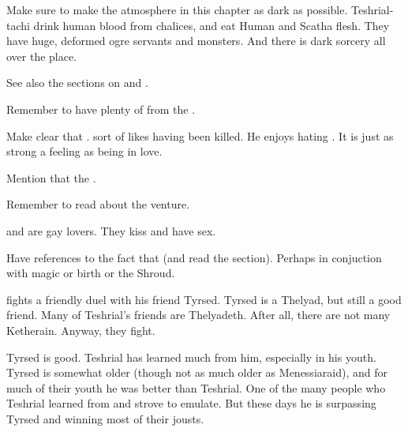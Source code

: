 





Make sure to make the atmosphere in this chapter as dark as possible. 
Teshrial-tachi drink human blood from chalices, and eat Human and Scatha flesh. 
They have huge, deformed ogre servants and monsters. 
And there is dark sorcery all over the place. 

See also the sections on  and . 

Remember to have plenty of  from the \resphain. 

Make clear that .
\Teshrial sort of likes having been killed. 
He enjoys hating \Ishnaruchaefir. 
It is just as strong a feeling as being in love.
    
Mention that the \resphain {}. 

Remember to read about the {\Malcur venture}. 

\Teshrial and \Menessiaraid are gay lovers. 
They kiss and have sex.
    
Have references to the fact that  (and read the section). 
Perhaps in conjuction with magic or birth or the Shroud.  









\begin{comment}
\subsection{Flying}
\end{comment}

\Teshrial{} fights a friendly duel with his friend Tyrsed.
Tyrsed is a Thelyad, but still a good friend. 
Many of Teshrial's friends are Thelyadeth. 
After all, there are not many Ketherain. 
Anyway, they fight. 

Tyrsed is good. 
Teshrial has learned much from him, especially in his youth. 
Tyrsed is somewhat older (though not as much older as Menessiaraid), and for much of their youth he was better than Teshrial. 
One of the many people who Teshrial learned from and strove to emulate. 
But these days he is surpassing Tyrsed and winning most of their jousts. 

